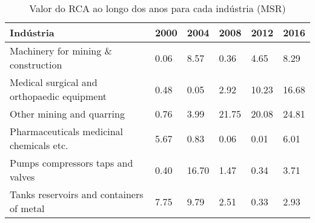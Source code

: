 \begin{table}
\centering
\caption{Valor do RCA ao longo dos anos para cada indústria (MSR)}
\label{tab:ex3-tempo-MSR}
\begin{tabular}{p{6cm}p{1.5cm}p{1.5cm}p{1.5cm}p{1.5cm}p{1.5cm}}
\toprule
                                 Indústria & 2000 &  2004 &  2008 &  2012 &  2016 \\
\midrule
       Machinery for mining \& construction & 0.06 &  8.57 &  0.36 &  4.65 &  8.29 \\
Medical surgical and orthopaedic equipment & 0.48 &  0.05 &  2.92 & 10.23 & 16.68 \\
                 Other mining and quarring & 0.76 &  3.99 & 21.75 & 20.08 & 24.81 \\
  Pharmaceuticals medicinal chemicals etc. & 5.67 &  0.83 &  0.06 &  0.01 &  6.01 \\
         Pumps compressors taps and valves & 0.40 & 16.70 &  1.47 &  0.34 &  3.71 \\
  Tanks reservoirs and containers of metal & 7.75 &  9.79 &  2.51 &  0.33 &  2.93 \\
\bottomrule
\end{tabular}
\end{table}

